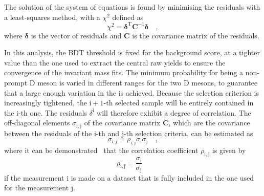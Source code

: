 The solution of the system of equations is found by minimising the residuals with a least-squares method, with a $\chi^2$ defined as 
\begin{equation*}
    \chi^2 = \pmb{\delta}^\mathrm{T}\mathbf{C}^{-1}\pmb{\delta}\quad ,
\end{equation*}
where $\pmb{\delta}$ is the vector of residuals and $\mathbf{C}$ is the covariance matrix of the residuals.

In this analysis, the BDT threshold is fixed for the background score, at a tighter value than the one used to extract the central raw yields to ensure the convergence of the invariant mass fits. The minimum probability for being a non-prompt D meson is varied in different ranges for the two D mesons, to guarantee that a large enough variation in the \fnp is achieved. Because the selection criterion is increasingly tightened, the $\mathrm{i+1}$-th selected sample will be entirely contained in the $\mathrm{i}$-th one. The residuals $\delta^\mathrm{i}$ will therefore exhibit a degree of correlation. The off-diagonal elements $\sigma_\mathrm{i,j}$ of the covariance matrix $\mathbf{C}$, which are the covariance between the residuals of the i-th and j-th selection criteria, can be estimated as 
\begin{equation*}
    \sigma_\mathrm{i,j} = \rho_\mathrm{i,j}\sigma_\mathrm{i}\sigma_\mathrm{j}\quad ,
\end{equation*}
where it can be demonstrated~\cite{cowan1998statistical} that the correlation coefficient $\rho_\mathrm{i,j}$ is given by 
\begin{equation*}
    \rho_\mathrm{i,j} = \frac{\sigma_\mathrm{i}}{\sigma_\mathrm{j}}\quad 
\end{equation*}
if the measurement i is made on a dataset that is fully included in the one used for the measurement j. 

